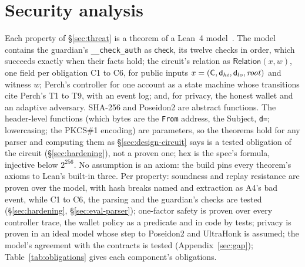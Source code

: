 \section{Security analysis}\label{sec:properties}

Each property of \S\ref{sec:threat} is a theorem of a Lean~4
model~\cite{lean4}. The model contains the guardian's \texttt{\_\_check\_auth}
as $\mathsf{check}$, its twelve checks in order, which succeeds exactly when
their facts hold; the circuit's relation as
$\mathsf{Relation}(x, w)$, one field per obligation C1 to C6, for public
inputs $x = (\mathsf{C}, \mathsf{d}_{hi}, \mathsf{d}_{lo}, \mathit{root})$ and witness $w$;
Perch's controller for one account as a state machine whose transitions cite
Perch's T1 to T9, with an event log; and, for privacy, the honest wallet and
an adaptive adversary. SHA-256 and Poseidon2 are abstract functions. The
header-level functions (which bytes are the \texttt{From} address, the
Subject, \texttt{d=}; lowercasing; the PKCS\#1 encoding) are parameters,
so the theorems hold for any parser and computing them as
\S\ref{sec:design-circuit} says is a tested obligation of the circuit
(\S\ref{sec:hardening}), not a proven one; $\mathrm{hex}$ is the spec's
formula, injective below $2^{256}$. No assumption is an axiom: the
build pins every theorem's axioms to Lean's built-in three.
Per property: soundness and replay resistance are proven over the model,
with hash breaks named and extraction as A4's bad event, while C1 to C6,
the parsing and the guardian's checks are tested (\S\ref{sec:hardening},
\S\ref{sec:eval-parser}); one-factor safety is proven over every controller
trace, the wallet policy as a predicate and in code by tests; privacy is
proven in an ideal model whose step to Poseidon2 and UltraHonk is assumed;
the model's agreement with the contracts is tested
(Appendix~\ref{sec:gap}); Table~\ref{tab:obligations} gives each
component's obligations.

